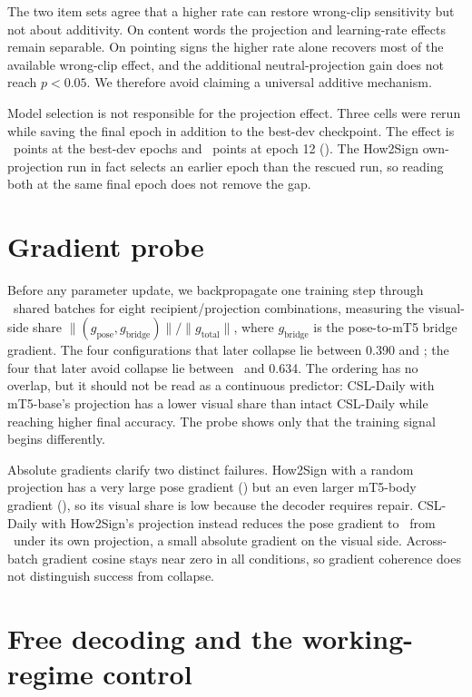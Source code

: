 \documentclass[11pt]{article}
\begin{document}
The two item sets agree that a higher rate can restore wrong-clip sensitivity but
not about additivity. On content words the projection and learning-rate effects
remain separable. On pointing signs the higher rate alone recovers most of the
available wrong-clip effect, and the additional neutral-projection gain does not
reach $p<0.05$. We therefore avoid claiming a universal additive mechanism.

Model selection is not responsible for the projection effect. Three cells were
rerun while saving the final epoch in addition to the best-dev checkpoint. The
effect is \SelHeadAtBestLexDeltaAbs\ points at the best-dev epochs and
\SelHeadAtLastLexDeltaAbs\ points at epoch 12 (\SelHeadAtLastLexCI). The
How2Sign own-projection run in fact selects an earlier epoch than the rescued
run, so reading both at the same final epoch does not remove the gap.

\section{Gradient probe}
\label{sec:grad}

Before any parameter update, we backpropagate one training step through
\GradProbeBatches\ shared batches for eight recipient/projection combinations,
measuring the visual-side share
$\lVert(g_{\mathrm{pose}},g_{\mathrm{bridge}})\rVert/\lVert g_{\mathrm{total}}\rVert$,
where $g_{\mathrm{bridge}}$ is the pose-to-mT5 bridge gradient. The four
configurations that later collapse lie between 0.390 and \GradDeadMaxShare; the
four that later avoid collapse lie between \GradWorksMinShare\ and 0.634. The
ordering has no overlap, but it should not be read as a continuous predictor:
CSL-Daily with mT5-base's projection has a lower visual share than intact
CSL-Daily while reaching higher final accuracy. The probe shows only that the
training signal begins differently.

Absolute gradients clarify two distinct failures. How2Sign with a random
projection has a very large pose gradient (\GradHowRandPose) but an even larger
mT5-body gradient (\GradHowRandBody), so its visual share is low because the
decoder requires repair. CSL-Daily with How2Sign's projection instead reduces the
pose gradient to \GradCslHowPose\ from \GradCslOwnPose\ under its own projection,
a small absolute gradient on the visual side. Across-batch gradient cosine stays
near zero in all conditions, so gradient coherence does not distinguish success
from collapse.

\section{Free decoding and the working-regime control}
\label{sec:working}
\end{document}
